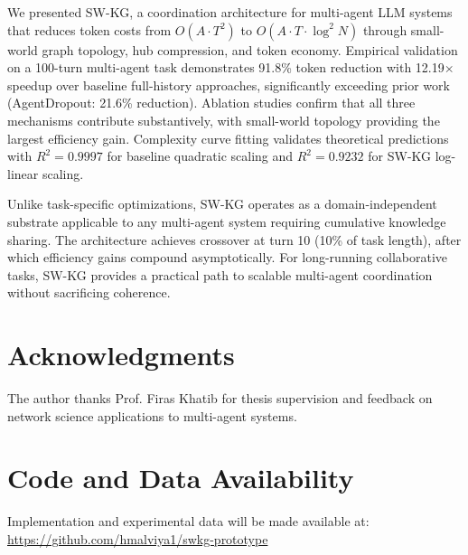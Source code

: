 \documentclass[11pt]{article}
\begin{document}
We presented SW-KG, a coordination architecture for multi-agent LLM systems that reduces token costs from $O(A \cdot T^2)$ to $O(A \cdot T \cdot \log^2 N)$ through small-world graph topology, hub compression, and token economy. Empirical validation on a 100-turn multi-agent task demonstrates 91.8\% token reduction with 12.19$\times$ speedup over baseline full-history approaches, significantly exceeding prior work (AgentDropout: 21.6\% reduction). Ablation studies confirm that all three mechanisms contribute substantively, with small-world topology providing the largest efficiency gain. Complexity curve fitting validates theoretical predictions with $R^2 = 0.9997$ for baseline quadratic scaling and $R^2 = 0.9232$ for SW-KG log-linear scaling.

Unlike task-specific optimizations, SW-KG operates as a domain-independent substrate applicable to any multi-agent system requiring cumulative knowledge sharing. The architecture achieves crossover at turn 10 (10\% of task length), after which efficiency gains compound asymptotically. For long-running collaborative tasks, SW-KG provides a practical path to scalable multi-agent coordination without sacrificing coherence.

\section*{Acknowledgments}

The author thanks Prof. Firas Khatib for thesis supervision and feedback on network science applications to multi-agent systems.

\section*{Code and Data Availability}

Implementation and experimental data will be made available at: \url{https://github.com/hmalviya1/swkg-prototype}
\end{document}
